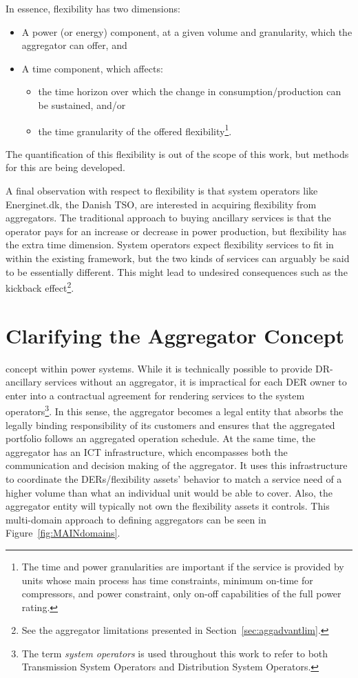 In essence, flexibility has two dimensions:
\begin{itemize}
	\item A power (or energy) component, at a given volume and granularity, which the aggregator can offer, and
	\item A time component, which affects:
		\begin{itemize}
			\item the time horizon over which the change in consumption/production can be sustained, and/or
			\item the time granularity of the offered flexibility\footnote{The time and power granularities are important if the service is provided by units whose main process has time constraints, \eg minimum on-time for compressors, and power constraint, \eg only on-off capabilities of the full power rating.}.
		\end{itemize}
\end{itemize}
The quantification of this flexibility is out of the scope of this work, but methods for this are being developed.

A final observation with respect to flexibility is that system operators like Energinet.dk, the Danish TSO, are interested in acquiring flexibility from aggregators. The traditional approach to buying ancillary services is that the operator pays for an increase or decrease in power production, but flexibility has the extra time dimension. System operators expect flexibility services to fit in within the existing framework, but the two kinds of services can arguably be said to be essentially different. This might lead to undesired consequences such as the kickback effect\footnote{See the aggregator limitations presented in Section~\ref{sec:aggadvantlim}.}. 

\section{Clarifying the Aggregator Concept}
 concept within power systems. While it is technically possible to provide DR-ancillary services without an aggregator, it is impractical for each DER owner to enter into a contractual agreement for rendering services to the system operators\footnote{The term \emph{system operators} is used throughout this work to refer to both Transmission System Operators and Distribution System Operators.}. In this sense, the aggregator becomes a legal entity that absorbs the legally binding responsibility of its customers and ensures that the aggregated portfolio follows an aggregated operation schedule. At the same time, the aggregator has an ICT infrastructure, which encompasses both the communication and decision making of the aggregator. It uses this infrastructure to coordinate the DERs/flexibility assets' behavior to match a service need of a higher volume than what an individual unit would be able to cover. Also, the aggregator entity will typically not own the flexibility assets it controls. This multi-domain approach to defining aggregators can be seen in Figure~\ref{fig:MAINdomains}.


